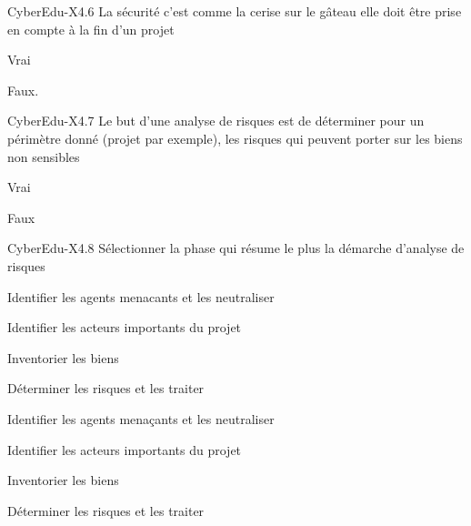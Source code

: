 \begin{multi}[multiple=true]{CyberEdu-X4.6}
La sécurité c'est comme la cerise sur le g\^ateau  elle doit être prise en compte à la fin d'un projet
\item	Vrai 
\item*	Faux.
\end{multi}
\begin{multi}[multiple=true]{CyberEdu-X4.7}
Le but d'une analyse de risques est de déterminer pour un périmètre donné (projet par exemple), les risques qui peuvent porter sur les biens non sensibles 
\item	Vrai 
\item*	Faux
\end{multi}

\begin{multi}[multiple=true]{CyberEdu-X4.8}
Sélectionner la phase qui résume le plus la démarche d'analyse de risques
\item Identifier les agents menacants et les neutraliser 
\item Identifier les acteurs importants du projet 
\item Inventorier les biens
\item* Déterminer les risques et les traiter
\end{multi}

\item Identifier les agents menaçants et les neutraliser 
\item Identifier les acteurs importants du projet 
\item Inventorier les biens
\item* Déterminer les risques et les traiter

